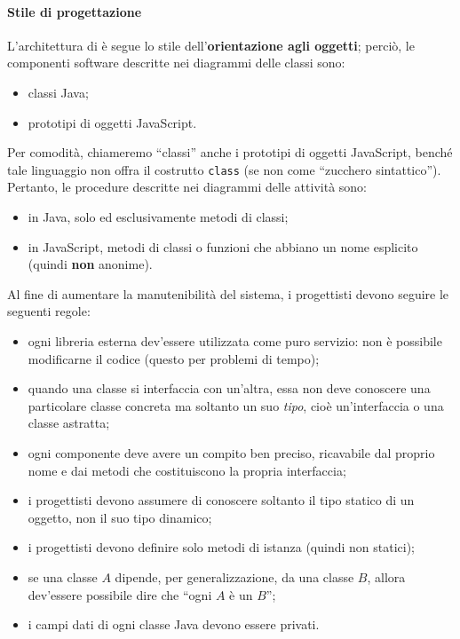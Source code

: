 	\paragraph{Stile di progettazione} L'architettura di \proj{} è segue lo stile dell'\textbf{orientazione agli oggetti}; perciò, le componenti software descritte nei diagrammi delle classi sono:
	\begin{itemize}
		\item classi Java;
		\item prototipi di oggetti JavaScript.
	\end{itemize}
	Per comodità, chiameremo “classi” anche i prototipi di oggetti JavaScript, benché tale linguaggio non offra il costrutto \texttt{class} (se non come “zucchero sintattico”). Pertanto, le procedure descritte nei diagrammi delle attività sono:
	\begin{itemize}
		\item in Java, solo ed esclusivamente metodi di classi;
		\item in JavaScript, metodi di classi o funzioni che abbiano un nome esplicito (quindi \textbf{non} anonime).
	\end{itemize}
	Al fine di aumentare la manutenibilità del sistema, i progettisti devono seguire le seguenti regole:
	\begin{itemize}
		\item ogni libreria esterna dev'essere utilizzata come puro servizio: non è possibile modificarne il codice (questo per problemi di tempo);
		\item quando una classe si interfaccia con un'altra, essa non deve conoscere una particolare classe concreta ma soltanto un suo \emph{tipo}, cioè un'interfaccia o una classe astratta;
		\item ogni componente deve avere un compito ben preciso, ricavabile dal proprio nome e dai metodi che costituiscono la propria interfaccia;
		\item i progettisti devono assumere di conoscere soltanto il tipo statico di un oggetto, non il suo tipo dinamico;
		\item i progettisti devono definire solo metodi di istanza (quindi non statici);
		\item se una classe $A$ dipende, per generalizzazione, da una classe $B$, allora dev'essere possibile dire che “ogni $A$ è un $B$”;
		\item i campi dati di ogni classe Java devono essere privati.
	\end{itemize}

